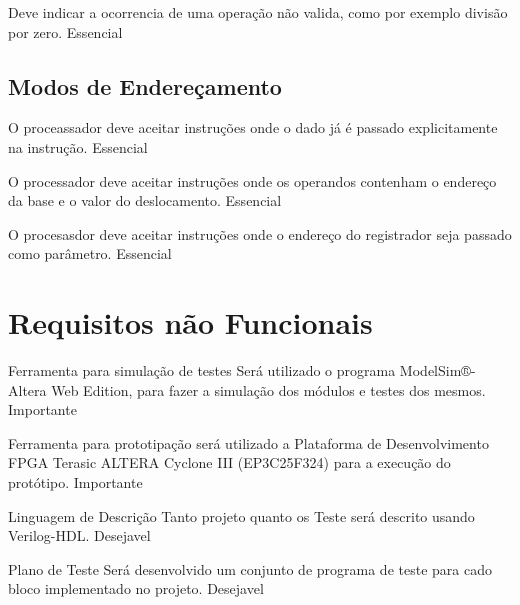 \documentclass{article}
\begin{document}
\begin{functional}
{{\begin{functional}
      {Deve indicar a ocorrencia de uma operação não valida, como por exemplo divisão por zero.}
      {Essencial}

     \end{functional}
     
     \subsection{Modos de Endereçamento}

    \begin{functional}

      {O proceassador deve aceitar instruções onde o dado já é passado explicitamente na instrução.}
      {Essencial}
      
          
      {O processador deve aceitar instruções onde os operandos contenham o endereço da base e o valor do deslocamento.}
      {Essencial}
      
      {O procesasdor deve aceitar instruções onde o endereço do registrador seja passado como parâmetro.}
      {Essencial}

     \end{functional}


\section{Requisitos não Funcionais}

  \begin{nonfunctional}

    \requirement
    {Ferramenta para simulação de testes}
    {Será utilizado o programa ModelSim®-Altera Web Edition, para fazer a simulação dos módulos e testes dos mesmos.}
    {Importante}
    
    \requirement
    {Ferramenta para prototipação}
    {será utilizado a Plataforma de Desenvolvimento FPGA  Terasic ALTERA Cyclone III (EP3C25F324) para a execução do protótipo.}
    {Importante}
    
    \requirement
    {Linguagem de Descrição}
    {Tanto projeto quanto os Teste será descrito usando Verilog-HDL.}
    {Desejavel}
    
    \requirement
    {Plano de Teste}
    {Será desenvolvido um conjunto de programa de teste para cado bloco implementado no projeto. }
    {Desejavel}
    

\end{nonfunctional}}}
\end{functional}
\end{document}
